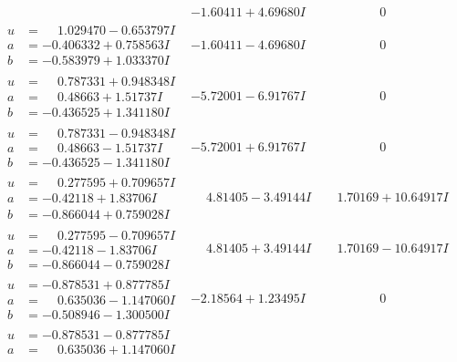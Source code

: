 \documentclass[1p]{elsarticle_modified}
\theoremstyle{definition}
\begin{document}
$$\begin{array}{c|c|c}
 & -1.60411 + 4.69680 I & \phantom{-0.000000 } 0 \\ \hline\begin{aligned}
u &= \phantom{-}1.029470 - 0.653797 I \\
a &= -0.406332 + 0.758563 I \\
b &= -0.583979 + 1.033370 I\end{aligned}
 & -1.60411 - 4.69680 I & \phantom{-0.000000 } 0 \\ \hline\begin{aligned}
u &= \phantom{-}0.787331 + 0.948348 I \\
a &= \phantom{-}0.48663 + 1.51737 I \\
b &= -0.436525 + 1.341180 I\end{aligned}
 & -5.72001 - 6.91767 I & \phantom{-0.000000 } 0 \\ \hline\begin{aligned}
u &= \phantom{-}0.787331 - 0.948348 I \\
a &= \phantom{-}0.48663 - 1.51737 I \\
b &= -0.436525 - 1.341180 I\end{aligned}
 & -5.72001 + 6.91767 I & \phantom{-0.000000 } 0 \\ \hline\begin{aligned}
u &= \phantom{-}0.277595 + 0.709657 I \\
a &= -0.42118 + 1.83706 I \\
b &= -0.866044 + 0.759028 I\end{aligned}
 & \phantom{-}4.81405 - 3.49144 I & \phantom{-}1.70169 + 10.64917 I \\ \hline\begin{aligned}
u &= \phantom{-}0.277595 - 0.709657 I \\
a &= -0.42118 - 1.83706 I \\
b &= -0.866044 - 0.759028 I\end{aligned}
 & \phantom{-}4.81405 + 3.49144 I & \phantom{-}1.70169 - 10.64917 I \\ \hline\begin{aligned}
u &= -0.878531 + 0.877785 I \\
a &= \phantom{-}0.635036 - 1.147060 I \\
b &= -0.508946 - 1.300500 I\end{aligned}
 & -2.18564 + 1.23495 I & \phantom{-0.000000 } 0 \\ \hline\begin{aligned}
u &= -0.878531 - 0.877785 I \\
a &= \phantom{-}0.635036 + 1.147060 I \\

\end{aligned}
\end{array}$$
\end{document}
